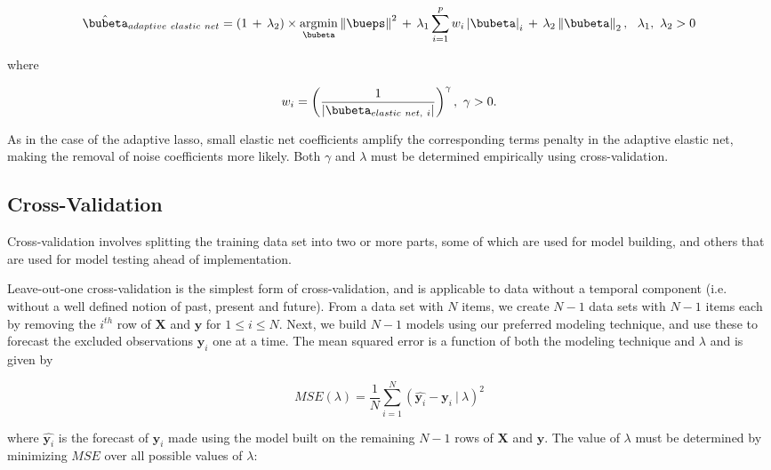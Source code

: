 \documentclass[graybox,envcountchap,sectrefs]{svmono}\usepackage[]{graphicx}\usepackage[]{xcolor}
\begin{document}
\begin{appendices}
\begin{equation}
\hat{\bubeta}_{adaptive\ elastic\ net}=\left(1\,+\,\lambda_{2}\right)\times\underset{\bubeta}{\mathrm{argmin}}\left\Vert \bueps\right\Vert ^{2}\,+\,\lambda_{1}\sum_{i=1}^{p}w_{i}\left|\bubeta\right|_{i}\,+\,\lambda_{2}\left\Vert \bubeta\right\Vert _{2},\ \ \lambda_{1},\ \lambda_{2}>0\label{eq:AdaptiveElasticNet}
\end{equation}

where

\begin{equation}
w_{i}=\left(\frac{1}{\left|\bubeta_{elastic\ net,\ i}\right|}\right)^{\gamma},\ \gamma>0.\label{eq:AdaptiveElasticNetWeights}
\end{equation}

As in the case of the adaptive lasso, small elastic net coefficients
amplify the corresponding terms penalty in the adaptive elastic net,
making the removal of noise coefficients more likely. Both $\gamma$
and $\lambda$ must be determined empirically using cross-validation. 

\subsection{Cross-Validation}

Cross-validation involves splitting the training data set into two
or more parts, some of which are used for model building, and others
that are used for model testing ahead of implementation. 

Leave-out-one cross-validation is the simplest form of cross-validation,
and is applicable to data without a temporal component (i.e. without
a well defined notion of past, present and future). From a data set
with $N$ items, we create $N-1$ data sets with $N-1$ items each
by removing the $i^{th}$ row of $\mathrm{\mathbf{X}}$ and $\mathrm{\mathbf{y}}$
for $1\leqslant i\leqslant N$. Next, we build $N-1$ models using
our preferred modeling technique, and use these to forecast the excluded
observations $\mathrm{\mathbf{y}}_{i}$ one at a time. The mean squared
error is a function of both the modeling technique and $\lambda$
and is given by

\begin{equation}
MSE\left(\lambda\right)=\frac{1}{N}\sum_{i=1}^{N}\left(\hat{\mathrm{\mathbf{y}}_{i}}-\mathrm{\mathbf{y}}_{i}\ |\ \lambda\right)^{2}\label{eq:MSECrossValidation}
\end{equation}

where $\hat{\mathrm{\mathbf{y}}_{i}}$ is the forecast of $\mathrm{\mathbf{y}}_{i}$
made using the model built on the remaining $N-1$ rows of $\mathrm{\mathbf{X}}$
and $\mathrm{\mathbf{y}}$. The value of $\lambda$ must be determined
by minimizing $MSE$ over all possible values of $\lambda$:


\end{appendices}
\end{document}
